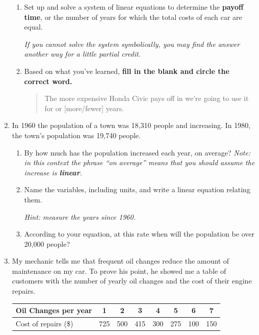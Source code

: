 \documentclass[12pt]{article}
\begin{document}
\begin{enumerate}
\begin{enumerate}
\item Set up and solve a system of linear equations to determine the \textbf{payoff time}, or the number of years for which the total costs of each car are equal.

\emph{If you cannot solve the system symbolically, you may find the answer another way for a little partial credit.}
\vfill

\item Based on what you've learned, \textbf{fill in the blank and circle the correct word.}

\begin{quote}
The more expensive Honda Civic pays off in we're going to use it for \hrulefill   or [more/fewer] years.  
\end{quote}

\end{enumerate}

\newpage



\item In 1960 the population of a town was 18,310 people and increasing.  In 1980, the town's population was 19,740 people.

\begin{enumerate}
\item By how much has the population increased each year, on average?  \emph{Note:  in this context the phrase ``on average'' means that you should assume the increase is \textbf{linear}.}
\vfill
\item Name the variables, including units, and write a linear equation relating them.

\emph{Hint:  measure the years since 1960.}
\vfill
\item According to your equation, at this rate when will the population be over 20,000 people?
\vfill
\end{enumerate}

\newpage %

\item My mechanic tells me that frequent oil changes reduce the amount of maintenance on my car.  To prove his point, he showed me a table of customers with the number of yearly oil changes and the cost of their engine repairs.

\begin{center}
\begin{tabular} {|l|c|c |c|c|c|c|c|}  \hline
Oil Changes per year & 1 & 2 & 3 & 4 & 5 & 6 & 7  \\ \hline
Cost of repairs (\$) & 725 & 500 & 415 & 300 & 275 & 100 & 150  \\ \hline
\end{tabular}
\end{center}


\end{enumerate}
\end{document}
